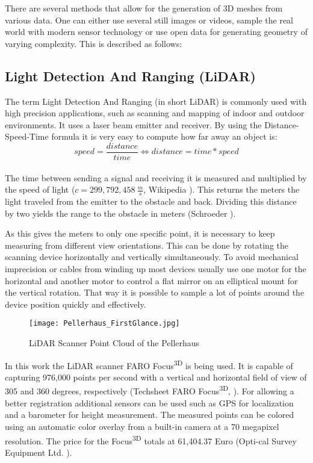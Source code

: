 There are several methods that allow for the generation of 3D meshes from various data. One can either use several still images or videos, sample the real world with modern sensor technology or use open data for generating geometry of varying complexity. This is described as follows:

\subsection{Light Detection And Ranging (LiDAR)}

The term Light Detection And Ranging (in short LiDAR) is commonly used with high precision applications, such as scanning and mapping of indoor and outdoor environments. It uses a laser beam emitter and receiver. By using the Distance-Speed-Time formula it is very easy to compute how far away an object is:\\

$$  speed = \dfrac{distance}{time} \Longleftrightarrow distance = time * speed $$\\
The time between sending a signal and receiving it is measured and multiplied by the speed of light ($c = 299,792,458 \medspace \frac{m}{s}$, Wikipedia \parencite{wiki:SpeedOfLight}). This returns the meters the light traveled from the emitter to the obstacle and back. Dividing this distance by two yields the range to the obstacle in meters (Schroeder \parencite[see][p8-9]{dp_lidar}).

As this gives the meters to only one specific point, it is necessary to keep measuring from different view orientations. This can be done by rotating the scanning device horizontally and vertically simultaneously. To avoid mechanical imprecision or cables from winding up most devices usually use one motor for the horizontal and another motor to control a flat mirror on an elliptical mount for the vertical rotation. That way it is possible to sample a lot of points around the device position quickly and effectively.

\begin{figure}[h]
	\centering
	\texttt{[image: Pellerhaus\_FirstGlance.jpg]}
	\caption{LiDAR Scanner Point Cloud of the Pellerhaus}
	\label{fig:LiDAR_PointCloud}
\end{figure}

In this work the LiDAR scanner FARO Focus\textsuperscript{3D} is being used. It is capable of capturing 976,000 points per second with a vertical and horizontal field of view of 305 and 360 degrees, respectively (Techsheet FARO Focus\textsuperscript{3D}, \parencite{faro_techsheet}). For allowing a better registration additional sensors can be used such as GPS for localization and a barometer for height measurement. The measured points can be colored using an automatic color overlay from a built-in camera at a 70 megapixel resolution. The price for the Focus\textsuperscript{3D} totals at 61,404.37 Euro (Opti-cal Survey Equipment Ltd. \parencite{survey_equipment}).

